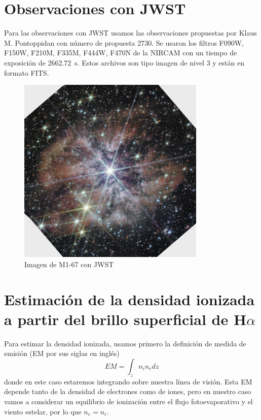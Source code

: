 \documentclass{book}
\begin{document}
\section{Observaciones con JWST}

Para las observaciones con JWST usamos las observaciones propuestas por Klaus M. Pontoppidan con número de propuesta 2730. Se usaron los filtros F090W, F150W, F210M, F335M, F444W, F470N de la NIRCAM con un tiempo de exposición de \SI{2662.72}{s}. Estos archivos son tipo imagen de nivel 3 y están en formato FITS.


\begin{figure}[h]
    \centering
    \includegraphics[width=0.8\textwidth]{M1-67-JWST.jpg}
    \caption{Imagen de M1-67 con JWST}
    \label{fig:M1-67JWST}
\end{figure}

\section{Estimación de la densidad ionizada a partir del brillo superficial de H$\alpha$}\label{Sec : estimacion de densidad}

Para estimar la densidad ionizada, usamos primero la definición de medida de emisión (EM por sus siglas en inglés)
\[EM=\int_z n_i n_edz\] donde en este caso estaremos integrando sobre nuestra línea de visión. Esta EM depende tanto de la densidad de electrones como de iones, pero en nuestro caso vamos a considerar un equilibrio de ionización entre el flujo fotoevaporativo y el viento estelar, por lo que $n_e=n_i$.
\end{document}
